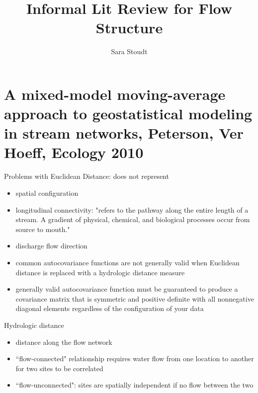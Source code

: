 \documentclass[12pt]{amsart}
\title{Informal Lit Review for Flow Structure}
\author{Sara Stoudt}
\begin{document}
\maketitle

\section{A mixed-model moving-average approach to geostatistical modeling
in stream networks, Peterson, Ver Hoeff, Ecology 2010}

Problems with Euclidean Distance:  does not represent 
\begin{itemize}
\item spatial configuration
\item longitudinal connectivity: "refers to the pathway along the entire length of a stream. A gradient of physical, chemical, and biological processes occur from source to mouth."
\item discharge
\ite flow direction
\item common autocovariance functions are not generally valid when Euclidean distance is replaced with a hydrologic distance measure
\item generally valid autocovariance function must be guaranteed to produce a covariance matrix that is symmetric and positive definite with all nonnegative diagonal elements regardless of the configuration of your data
\end{itemize}

Hydrologic distance
\begin{itemize}
\item distance along the flow network
\item ``flow-connected" relationship requires water flow from one location to another for two sites to be correlated
\item ``flow-unconnected": sites are spatially independent if no flow between the two
\end{itemize}
\end{document}
